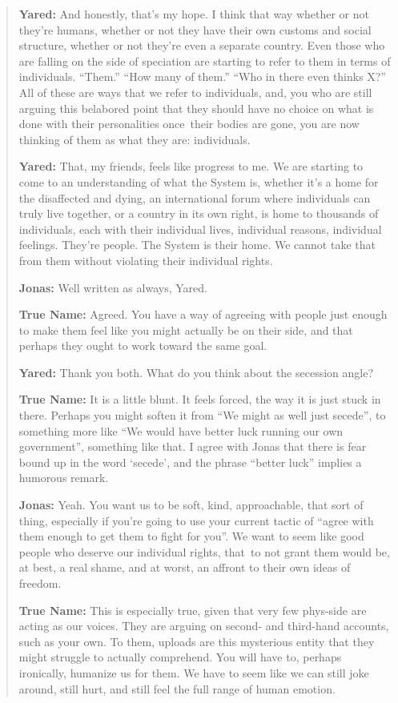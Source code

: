 \begin{quote}
\textbf{Yared:} And honestly, that's my hope. I think that way whether or not they're humans, whether or not they have their own customs and social structure, whether or not they're even a separate country. Even those who are falling on the side of speciation are starting to refer to them in terms of individuals. ``Them.'' ``How many of them.'' ``Who in there even thinks X?'' All of these are ways that we refer to individuals, and, you who are still arguing this belabored point that they should have no choice on what is done with their personalities once\pagebreak\ their bodies are gone, you are now thinking of them as what they are: individuals.

\textbf{Yared:} That, my friends, feels like progress to me. We are starting to come to an understanding of what the System is, whether it's a home for the disaffected and dying, an international forum where individuals can truly live together, or a country in its own right, is home to thousands of individuals, each with their individual lives, individual reasons, individual feelings. They're people. The System is their home. We cannot take that from them without violating their individual rights.

\textbf{Jonas:} Well written as always, Yared.

\textbf{True Name:} Agreed. You have a way of agreeing with people just enough to make them feel like you might actually be on their side, and that perhaps they ought to work toward the same goal.

\textbf{Yared:} Thank you both. What do you think about the secession angle?

\textbf{True Name:} It is a little blunt. It feels forced, the way it is just stuck in there. Perhaps you might soften it from ``We might as well just secede'', to something more like ``We would have better luck running our own government'', something like that. I agree with Jonas that there is fear bound up in the word `secede', and the phrase ``better luck'' implies a humorous remark.

\textbf{Jonas:} Yeah. You want us to be soft, kind, approachable, that sort of thing, especially if you're going to use your current tactic of ``agree with them enough to get them to fight for you''. We want to seem like good people who deserve our individual rights, that\pagebreak\ to not grant them would be, at best, a real shame, and at worst, an affront to their own ideas of freedom.

\textbf{True Name:} This is especially true, given that very few phys-side are acting as our voices. They are arguing on second- and third-hand accounts, such as your own. To them, uploads are this mysterious entity that they might struggle to actually comprehend. You will have to, perhaps ironically, humanize us for them. We have to seem like we can still joke around, still hurt, and still feel the full range of human emotion.


\end{quote}
